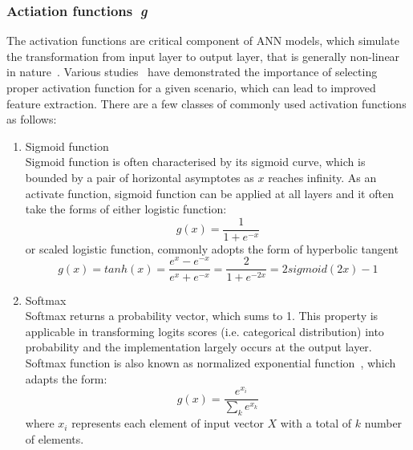 \subsubsection{Actiation functions~\textit{g}}
The activation functions are critical component of ANN models, which simulate the transformation from input layer to output layer, that is generally non-linear in nature~\cite{LeCun_2015}. Various studies~\cite{Bengio_2012,Singh_2013} have demonstrated the importance of selecting proper activation function for a given scenario, which can lead to improved feature extraction. There are a few classes of commonly used activation functions as follows:
\begin{enumerate}
\item Sigmoid function \\
Sigmoid function is often characterised by its sigmoid curve, which is bounded by a pair of horizontal asymptotes as $x$ reaches infinity. As an activate function, sigmoid function can be applied at all layers and it often take the forms of either logistic function:
\begin{equation}
    g(x) = \frac{1} {1+ e^{-x}}
\end{equation}
or scaled logistic function, commonly adopts the form of hyperbolic tangent
\begin{equation}
    g(x) = tanh(x) = \frac{e^x-e^{-x}} {e^x + e^{-x}} = \frac {2} {1 + e^{-2x}} = 2 sigmoid(2x) - 1
\end{equation}

\item Softmax \\
Softmax returns a probability vector, which sums to 1. This property is applicable in transforming logits scores (i.e.  categorical distribution) into probability and the implementation largely occurs at the output layer. Softmax function is also known as normalized exponential function~\cite{Howard_2007}, which adapts the form: 
\begin{equation}
    g(x) = \frac{e^{x_i}} {\sum_k e^{x_k}}
\end{equation}
where $x_i$ represents each element of input vector $X$ with a total of $k$ number of elements. 


\end{enumerate}
